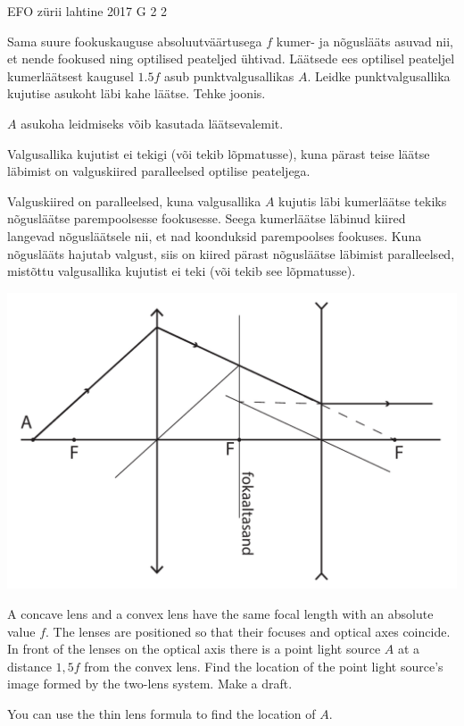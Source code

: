 {EFO zürii} %
{lahtine} %
{2017} %
{G 2} %
{2} %
{
\ifStatement
Sama suure fookuskauguse absoluutväärtusega $f$ kumer- ja nõguslääts asuvad nii, et nende fookused ning optilised peateljed ühtivad. Läätsede ees optilisel peateljel kumerläätsest kaugusel $\num{1,5}f$ asub punktvalgusallikas $A$. Leidke punktvalgusallika kujutise asukoht läbi kahe läätse. Tehke joonis.
\fi


\ifHint
$A$ asukoha leidmiseks võib kasutada läätsevalemit.
\fi


\ifSolution
Valgusallika kujutist ei tekigi (või tekib lõpmatusse), kuna pärast teise läätse läbimist on valguskiired paralleelsed optilise peateljega.

Valguskiired on paralleelsed, kuna  valgusallika $A$ kujutis läbi kumerläätse tekiks nõgusläätse parempoolsesse fookusesse. Seega kumerläätse läbinud kiired langevad nõgusläätsele nii, et nad koonduksid parempoolses fookuses. Kuna nõguslääts hajutab valgust, siis on kiired pärast nõgusläätse läbimist paralleelsed, mistõttu valgusallika kujutist ei teki (või tekib see lõpmatusse).

\begin{center}
	\includegraphics[width=0.7\linewidth]{2017-lahg-02-valgusallikaslah}
\end{center}
\fi


\ifEngStatement
A concave lens and a convex lens have the same focal length with an absolute value $f$. The lenses are positioned so that their focuses and optical axes coincide. In front of the lenses on the optical axis there is a point light source $A$ at a distance $1,5f$ from the convex lens. Find the location of the point light source's image formed by the two-lens system. Make a draft.
\fi


\ifEngHint
You can use the thin lens formula to find the location of $A$.
\fi


}
